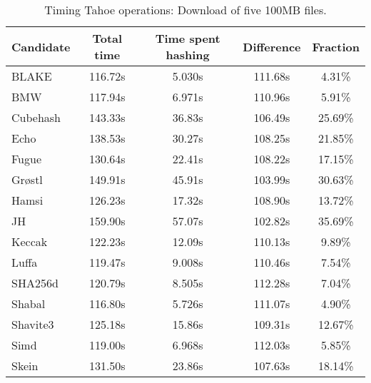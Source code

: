 \begin{table}[h]
  \centering
  \begin{tabular}{ | l | c | c | c | c | }
    \hline
    Candidate & Total time & Time spent hashing & Difference & Fraction \\ \hline
    BLAKE     &  116.72s  &  5.030s  &  111.68s  &  4.31\%   \\  \hline
    BMW       &  117.94s  &  6.971s  &  110.96s  &  5.91\%   \\  \hline
    Cubehash  &  143.33s  &  36.83s  &  106.49s  &  25.69\%  \\  \hline
    Echo      &  138.53s  &  30.27s  &  108.25s  &  21.85\%  \\  \hline
    Fugue     &  130.64s  &  22.41s  &  108.22s  &  17.15\%  \\  \hline
    Grøstl    &  149.91s  &  45.91s  &  103.99s  &  30.63\%  \\  \hline
    Hamsi     &  126.23s  &  17.32s  &  108.90s  &  13.72\%  \\  \hline
    JH        &  159.90s  &  57.07s  &  102.82s  &  35.69\%  \\  \hline
    Keccak    &  122.23s  &  12.09s  &  110.13s  &  9.89\%   \\  \hline
    Luffa     &  119.47s  &  9.008s  &  110.46s  &  7.54\%   \\  \hline
    SHA256d   &  120.79s  &  8.505s  &  112.28s  &  7.04\%   \\  \hline
    Shabal    &  116.80s  &  5.726s  &  111.07s  &  4.90\%   \\  \hline
    Shavite3  &  125.18s  &  15.86s  &  109.31s  &  12.67\%  \\  \hline
    Simd      &  119.00s  &  6.968s  &  112.03s  &  5.85\%   \\  \hline
    Skein     &  131.50s  &  23.86s  &  107.63s  &  18.14\%  \\  \hline
  \end{tabular}
  \caption{Timing Tahoe operations: Download of five 100MB files.}
  \label{tbl:hashingtimes:get100mb}
\end{table}
